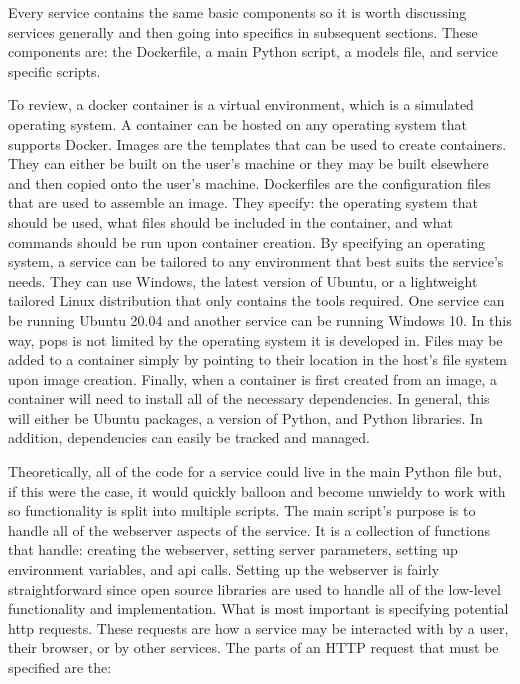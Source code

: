 Every service contains the same basic components so it is worth discussing
services generally and then going into specifics in subsequent sections. These
components are: the Dockerfile, a main Python script, a models file, and
service specific scripts.

To review, a docker container is a virtual environment, which is a simulated
operating system. A container can be hosted on any operating system that
supports Docker. Images are the templates that can be used to create
containers. They can either be built on the user's machine or they may be built
elsewhere and then copied onto the user's machine. Dockerfiles are the
configuration files that are used to assemble an image. They specify: the
operating system that should be used, what files should be included in the
container, and what commands should be run upon container creation. By
specifying an operating system, a service can be tailored to any environment
that best suits the service's needs.  They can use Windows, the latest version
of Ubuntu, or a lightweight tailored Linux distribution that only contains the
tools required. One service can be running Ubuntu 20.04 and another service can
be running Windows 10. In this way, \gls{pops} is not limited by the operating
system it is developed in.  Files may be added to a container simply by
pointing to their location in the host's file system upon image creation.
Finally, when a container is first created from an image, a container will need
to install all of the necessary dependencies. In general, this will either be
Ubuntu packages, a version of Python, and Python libraries.  In addition,
dependencies can easily be tracked and managed. 

Theoretically, all of the code for a service could live in the main Python file
but, if this were the case, it would quickly balloon and become unwieldy to
work with so functionality is split into multiple scripts. The main script's
purpose is to handle all of the webserver aspects of the service. It is a
collection of functions that handle: creating the webserver, setting server
parameters, setting up environment variables, and \gls{api} calls.  Setting up
the webserver is fairly straightforward since open source libraries are used to
handle all of the low-level functionality and implementation. What is most
important is specifying potential \gls{http} requests. These requests are how a
service may be interacted with by a user, their browser, or by other services.
The parts of an HTTP request that must be specified are the: 

